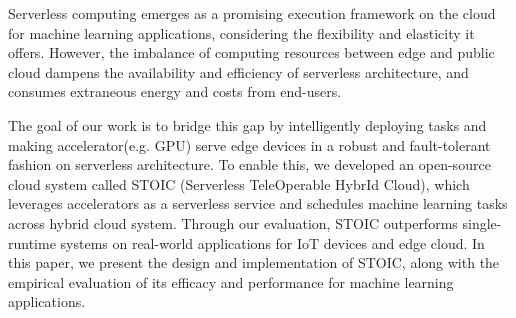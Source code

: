 Serverless computing emerges as a promising execution framework on the cloud for machine learning applications, considering the flexibility and elasticity it offers. However, the imbalance of computing resources between edge and public cloud dampens the availability and efficiency of serverless architecture, and consumes extraneous energy and costs from end-users. 

The goal of our work is to bridge this gap by intelligently deploying tasks and making accelerator(e.g. GPU) serve edge devices in a robust and fault-tolerant fashion on serverless architecture. To enable this, we developed an open-source cloud system called STOIC (Serverless TeleOperable HybrId Cloud), which leverages accelerators as a serverless service and schedules machine learning tasks across hybrid cloud system. Through our evaluation, STOIC outperforms single-runtime systems on real-world applications for IoT devices and edge cloud. In this paper, we present the design and implementation of STOIC, along with the empirical evaluation of its efficacy and performance for machine learning applications.